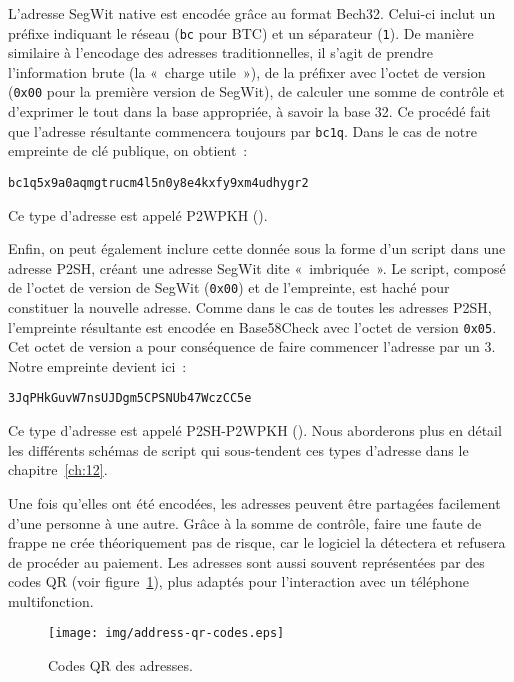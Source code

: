 L'adresse SegWit native est encodée grâce au format Bech32. Celui-ci inclut un préfixe indiquant le réseau (\texttt{bc} pour BTC) et un séparateur (\texttt{1}). De manière similaire à l'encodage des adresses traditionnelles, il s'agit de prendre l'information brute (la «~charge utile~»), de la préfixer avec l'octet de version (\texttt{0x00} pour la première version de SegWit), de calculer une somme de contrôle et d'exprimer le tout dans la base appropriée, à savoir la base 32. Ce procédé fait que l'adresse résultante commencera toujours par \texttt{bc1q}. Dans le cas de notre empreinte de clé publique, on obtient~:

\begin{Verbatim}[fontsize=\small]
bc1q5x9a0aqmgtrucm4l5n0y8e4kxfy9xm4udhygr2
\end{Verbatim}

Ce type d'adresse est appelé P2WPKH ().

Enfin, on peut également inclure cette donnée sous la forme d'un script dans une adresse P2SH, créant une adresse SegWit dite «~imbriquée~». Le script, composé de l'octet de version de SegWit (\texttt{0x00}) et de l'empreinte, est haché pour constituer la nouvelle adresse. Comme dans le cas de toutes les adresses P2SH, l'empreinte résultante est encodée en Base58Check avec l'octet de version \texttt{0x05}. Cet octet de version a pour conséquence de faire commencer l'adresse par un 3. Notre empreinte devient ici~:

\begin{Verbatim}[fontsize=\small]
3JqPHkGuvW7nsUJDgm5CPSNUb47WczCC5e
\end{Verbatim}

Ce type d'adresse est appelé P2SH-P2WPKH (). Nous aborderons plus en détail les différents schémas de script qui sous-tendent ces types d'adresse dans le chapitre~\ref{ch:12}.

Une fois qu'elles ont été encodées, les adresses peuvent être partagées facilement d'une personne à une autre. Grâce à la somme de contrôle, faire une faute de frappe ne crée théoriquement pas de risque, car le logiciel la détectera et refusera de procéder au paiement. Les adresses sont aussi souvent représentées par des codes QR (voir figure~\ref{fig:address-qr-codes}), plus adaptés pour l'interaction avec un téléphone multifonction.

\begin{figure}[h]
  \centering
  \texttt{[image: img/address-qr-codes.eps]}
  \caption{Codes QR des adresses.}
  \label{fig:address-qr-codes}
\end{figure}

